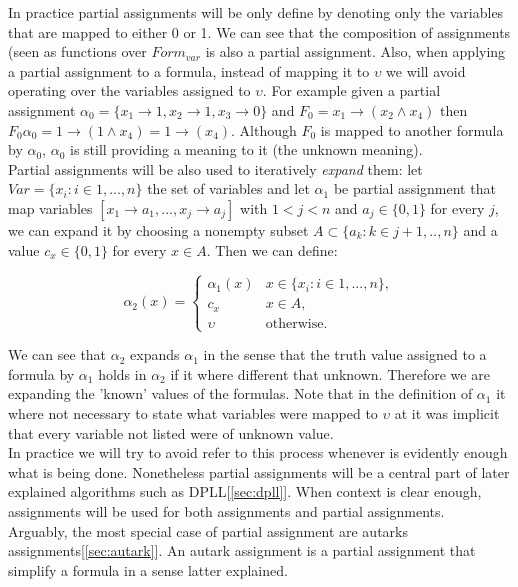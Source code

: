 In practice partial assignments will be only define by denoting only the variables that are mapped to either 0 or 1. We can see that the composition of assignments (seen as functions over $Form_{var}$ is also a partial assignment. Also, when applying a partial assignment to a formula, instead of mapping it to $\upsilon$ we will avoid operating over the variables assigned to $\upsilon$. For example given a partial assignment $\alpha_0 = \{x_1 \to 1, x_2\to 1, x_3 \to 0\}$ and $F_0=x_1\to (x_2\wedge x_4)$ then  $F_0\alpha_0=1 \to (1\wedge x_4)= 1 \to (x_4)$. Although $F_0$ is mapped to another formula by $\alpha_0$, $\alpha_0$ is still providing a meaning to it (the unknown meaning). \\



Partial assignments will be also used to iteratively \emph{expand} them: let $Var= \{x_i:i\in 1,...,n\}$ the set of variables and let $\alpha_1$ be partial assignment that map variables $[x_1\to a_1,...,x_j\to a_j]$ with $1<j<n$ and $a_j\in\{0,1\}$ for every $j$, we can expand it by choosing a nonempty subset  $A\subset\{a_k: k\in j+1,..,n\}$ and a value $c_x \in \{0,1\}$ for every $x\in A$. Then we can define:

$$
\alpha_2(x)=
\begin{cases}
  \alpha_1(x) & x \in \{x_i : i \in 1,...,n\},\\
  c_x & x\in A, \\
  \upsilon & \text{otherwise}.
\end{cases}
$$

We can see that $\alpha_2$ expands $\alpha_1$ in the sense that the truth value assigned to a formula by $\alpha_1$ holds in $\alpha_2$ if it where different that unknown. Therefore we are expanding the 'known' values of the formulas. Note that in the definition of $\alpha_1$ it where not necessary to state what variables were mapped to $\upsilon$ at it was implicit that every variable not listed were of unknown  value.\\

In practice we will try to avoid refer to this process whenever is evidently enough what is being done. Nonetheless partial assignments will be a central part of later explained algorithms such as DPLL[\ref{sec:dpll}]. When context is clear enough, assignments will be used for both assignments and partial assignments.\\

Arguably, the most special case of partial assignment are autarks assignments[\ref{sec:autark}]. An autark assignment is a partial assignment that simplify a formula in a sense latter explained.\\

